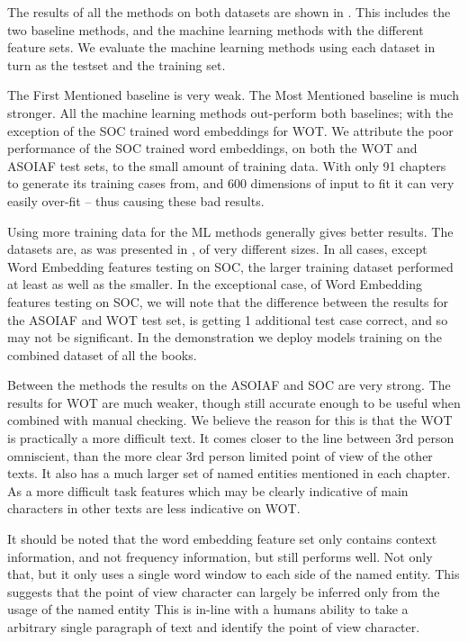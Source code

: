\documentclass[11pt,a4paper]{article}
\begin{document}
The results of all the methods on both datasets are shown in .
This includes the two baseline methods, and the machine learning methods with the different feature sets.
We evaluate the machine learning methods using each dataset in turn as the testset and the training set.

The First Mentioned baseline is very weak.
The Most Mentioned baseline is much stronger.
All the machine learning methods out-perform both baselines;
with the exception of the SOC trained word embeddings for WOT.
We attribute the poor performance of the SOC trained word embeddings, on both the  WOT and ASOIAF test sets, to the small amount of training data.
With only 91 chapters to generate its training cases from, and 600 dimensions of input to fit it can very easily over-fit -- thus causing these bad results.


Using more training data for the ML methods generally gives better results.
The datasets are, as was presented in , of very different sizes.
In all cases, except Word Embedding features testing on SOC, the larger training dataset performed at least as well as the smaller.
In the exceptional case, of Word Embedding features testing on SOC,
we will note that the difference between the results for the ASOIAF and WOT test set,
is getting 1 additional test case correct, and so may not be significant. 
In the demonstration we deploy models training on the combined dataset of all the books.


Between the methods the results on the ASOIAF and SOC are very strong.
The results for WOT are much weaker, though still accurate enough to be useful
when combined with manual checking.
We believe the reason for this is that the WOT is practically a more difficult text.
It comes closer to the line between 3rd person omniscient, than the more clear 3rd person limited point of view of the other texts.
It also has a much larger set of named entities mentioned in each chapter.
As a more difficult task features which may be clearly indicative of main characters in other texts are less indicative on WOT.


It should be noted that the word embedding feature set only contains context information, and not frequency information, but still performs well.
Not only that, but it only uses a single word window to each side of the named entity.
This suggests that the point of view character can largely be inferred only from the usage of the named entity
This is in-line with a humans ability to take a arbitrary single paragraph of text and identify the point of view character.
\end{document}
